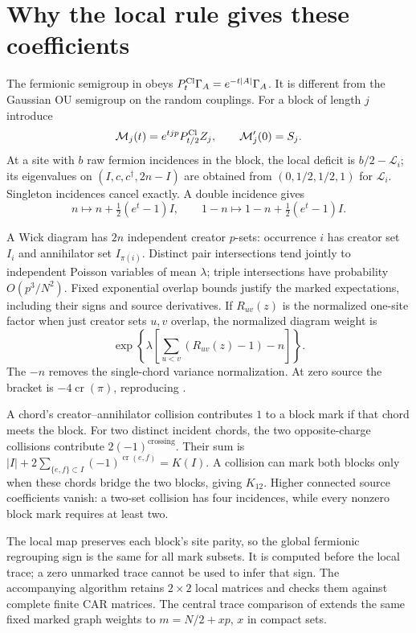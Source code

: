 \documentclass[11pt]{article}
\newcommand{\LL}{\mathcal L}
\newcommand{\crs}{\operatorname{cr}}
\begin{document}
\newpage
\section{Why the local rule gives these coefficients}
The fermionic semigroup in \cite{CL} obeys
$P_t^{\rm Cl}\Gamma_A=e^{-t|A|}\Gamma_A$.
It is different from the Gaussian OU semigroup on the random couplings.
For a block of length $j$ introduce
\begin{equation}
 \mathcal M_j(t)=e^{tjp}P_{t/2}^{\rm Cl}Z_j,
 \qquad\mathcal M'_j(0)=S_j.
\end{equation}
At a site with $b$ raw fermion incidences in the block, the local
deficit is $b/2-\LL_i$; its eigenvalues on
$(I,c,c^\dagger,2n-I)$ are obtained from $(0,1/2,1/2,1)$ for $\LL_i$.
Singleton incidences cancel exactly. A double incidence gives
\begin{equation}
 n\longmapsto n+\tfrac12(e^t-1)I,
 \qquad 1-n\longmapsto1-n+\tfrac12(e^t-1)I.\label{eq:local}
\end{equation}

A Wick diagram has $2n$ independent creator $p$-sets: occurrence $i$
has creator set $I_i$ and annihilator set $I_{\pi(i)}$.
Distinct pair intersections tend jointly to independent Poisson
variables of mean $\lambda$; triple intersections have probability
$O(p^3/N^2)$. Fixed exponential overlap bounds justify the marked
expectations, including their signs and source derivatives.
If $R_{uv}(z)$ is the normalized one-site factor when just creator
sets $u,v$ overlap, the normalized diagram weight is
\begin{equation}
 \exp\!\left\{\lambda\left[
       \sum_{u<v}(R_{uv}(z)-1)-n\right]\right\}.\label{eq:Poisson}
\end{equation}
The $-n$ removes the single-chord variance normalization.
At zero source the bracket is $-4\crs(\pi)$, reproducing \cite{BNR}.

A chord's creator--annihilator collision contributes $1$ to a block
mark if that chord meets the block. For two distinct incident chords,
the two opposite-charge collisions contribute
$2(-1)^{\text{crossing}}$. Their sum is
$|I|+2\sum_{\{e,f\}\subset I}(-1)^{\crs(e,f)}=K(I)$.
A collision can mark both blocks only when these chords bridge the
two blocks, giving $K_{12}$. Higher connected source coefficients
vanish: a two-set collision has four incidences, while every nonzero
block mark requires at least two.

The local map preserves each block's site parity, so the global
fermionic regrouping sign is the same for all mark subsets. It is
computed before the local trace; a zero unmarked trace cannot be
used to infer that sign. The accompanying algorithm retains $2\times2$
local matrices and checks them against complete finite CAR matrices.
The central trace comparison of \cite{Central} extends the same
fixed marked graph weights to $m=N/2+xp$, $x$ in compact sets.
\end{document}
